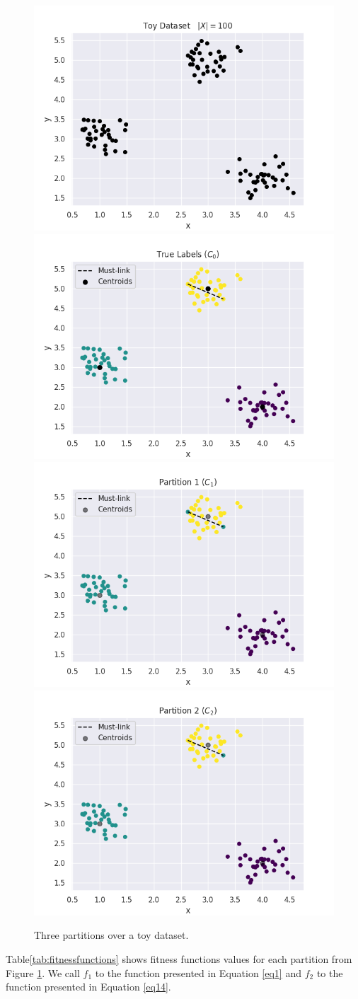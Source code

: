 \documentclass[review]{elsarticle}
\newcommand{\myfloatalign}{\centering}
\begin{document}
\begin{figure}[bth]
	\myfloatalign
	{\includegraphics[width=.45\linewidth]{Figures/Dataset}} \quad
	{\includegraphics[width=.45\linewidth]{Figures/C0}} \quad
	{\includegraphics[width=.45\linewidth]{Figures/C1}} \quad
	{\includegraphics[width=.45\linewidth]{Figures/C2}} \quad
	\caption{Three partitions over a toy dataset.}
	\label{img:toydatasets}
\end{figure}

Table\ref{tab:fitnessfunctions} shows fitness functions values for each partition from Figure \ref{img:toydatasets}. We call $f_1$ to the function presented in Equation \eqref{eq1} and $f_2$ to the function presented in Equation \eqref{eq14}.
\end{document}
